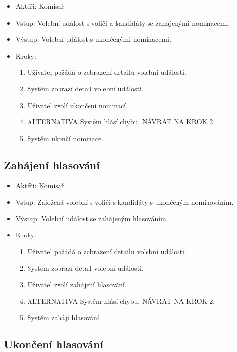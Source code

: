 \documentclass[11pt,twoside,a4paper]{book}
\begin{document}
\begin{itemize}
\item Aktéři: Komisař
\item Vstup: Volební událost s voliči a kandidáty se zahájenými nominacemi.
\item Výstup: Volební událost s ukončenými nominacemi.
\item Kroky:
	\begin{enumerate}
		\item Uživatel požádá o zobrazení detailu volební události.
		\item Systém zobrazí detail volební události.
		\item Uživatel zvolí ukončení nominací.		
		\item ALTERNATIVA Systém hlásí chybu. NÁVRAT NA KROK 2.
		\item Systém ukončí nominace.
	\end{enumerate}
\end{itemize}

\subsection{Zahájení hlasování}

\begin{itemize}
\item Aktéři: Komisař
\item Vstup: Založená volební s voliči s kandidáty s ukončeným nominováním.
\item Výstup: Volební událost se zahájeným hlasováním.
\item Kroky:
	\begin{enumerate}
		\item Uživatel požádá o zobrazení detailu volební události.
		\item Systém zobrazí detail volební události.
		\item Uživatel zvolí zahájení hlasování.		
		\item ALTERNATIVA Systém hlásí chybu. NÁVRAT NA KROK 2.
		\item Systém zahájí hlasování.
	\end{enumerate}
\end{itemize}

\subsection{Ukončení hlasování}
\end{document}

